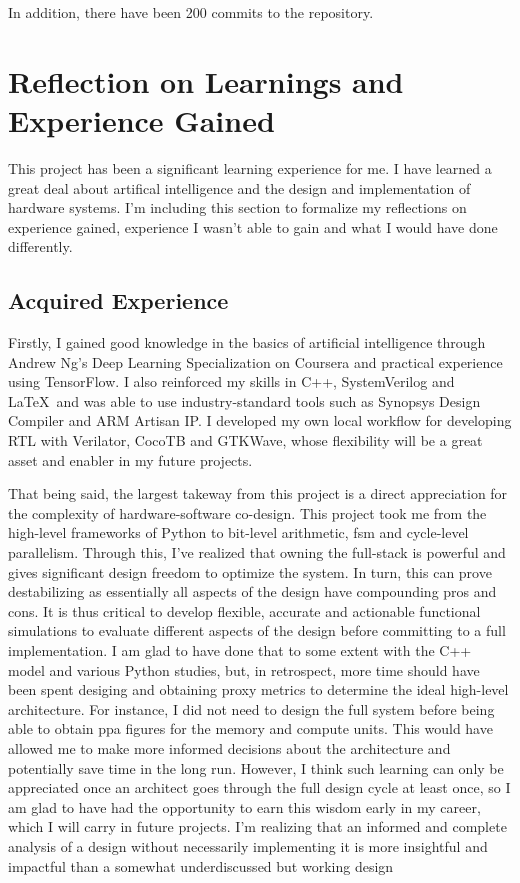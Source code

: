 In addition, there have been 200 commits to the repository.

\newpage
\section{Reflection on Learnings and Experience Gained}
This project has been a significant learning experience for me. I have learned a great deal about artifical intelligence and the design and implementation of hardware systems. I'm including this
section to formalize my reflections on experience gained, experience I wasn't able to gain and what I would have done differently.

\subsection{Acquired Experience}
Firstly, I gained good knowledge in the basics of artificial intelligence through Andrew Ng's Deep Learning Specialization on Coursera and practical experience using TensorFlow. I also reinforced
my skills in C++, SystemVerilog and \LaTeX\ and was able to use industry-standard tools such as Synopsys Design Compiler and ARM Artisan IP. I developed my own local workflow for developing RTL
with Verilator, CocoTB and GTKWave, whose flexibility will be a great asset and enabler in my future projects.

That being said, the largest takeway from this project is a direct appreciation for the complexity of hardware-software co-design. This project took me from the high-level frameworks of Python
to bit-level arithmetic, \ac{fsm} and cycle-level parallelism. Through this, I've realized that owning the full-stack is powerful and gives significant design freedom to optimize the system. In
turn, this can prove destabilizing as essentially all aspects of the design have compounding pros and cons. It is thus critical to develop flexible, accurate and actionable functional simulations
to evaluate different aspects of the design before committing to a full implementation. I am glad to have done that to some extent with the C++ model and various Python studies, but, in retrospect,
more time should have been spent desiging and obtaining proxy metrics to determine the ideal high-level architecture. For instance, I did not need to design the full system before being able to
obtain \ac{ppa} figures for the memory and compute units. This would have allowed me to make more informed decisions about the architecture and potentially save time in the long run. However, I
think such learning can only be appreciated once an architect goes through the full design cycle at least once, so I am glad to have had the opportunity to earn this wisdom early in my career,
which I will carry in future projects. I'm realizing that an informed and complete analysis of a design without necessarily implementing it is more insightful and impactful than a somewhat
underdiscussed but working design


